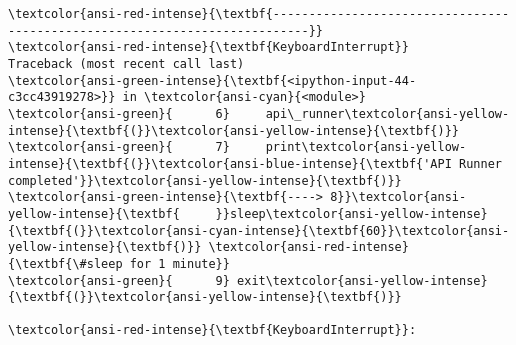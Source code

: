 \documentclass[11pt]{article}
\begin{document}
    \begin{Verbatim}[commandchars=\\\{\}, frame=single, framerule=2mm, rulecolor=\color{outerrorbackground}]
\textcolor{ansi-red-intense}{\textbf{---------------------------------------------------------------------------}}
\textcolor{ansi-red-intense}{\textbf{KeyboardInterrupt}}                         Traceback (most recent call last)
\textcolor{ansi-green-intense}{\textbf{<ipython-input-44-c3cc43919278>}} in \textcolor{ansi-cyan}{<module>}
\textcolor{ansi-green}{      6}     api\_runner\textcolor{ansi-yellow-intense}{\textbf{(}}\textcolor{ansi-yellow-intense}{\textbf{)}}
\textcolor{ansi-green}{      7}     print\textcolor{ansi-yellow-intense}{\textbf{(}}\textcolor{ansi-blue-intense}{\textbf{'API Runner completed'}}\textcolor{ansi-yellow-intense}{\textbf{)}}
\textcolor{ansi-green-intense}{\textbf{----> 8}}\textcolor{ansi-yellow-intense}{\textbf{     }}sleep\textcolor{ansi-yellow-intense}{\textbf{(}}\textcolor{ansi-cyan-intense}{\textbf{60}}\textcolor{ansi-yellow-intense}{\textbf{)}} \textcolor{ansi-red-intense}{\textbf{\#sleep for 1 minute}}
\textcolor{ansi-green}{      9} exit\textcolor{ansi-yellow-intense}{\textbf{(}}\textcolor{ansi-yellow-intense}{\textbf{)}}

\textcolor{ansi-red-intense}{\textbf{KeyboardInterrupt}}: 
    \end{Verbatim}
\end{document}
